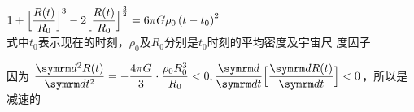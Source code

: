 \achapter

\answer $1+\Bigl[\dfrac{R(t)}{R_{0}}\Bigr]^{3}-2\Bigl[\dfrac{R(t)}{R_{0}}\Bigr]^{\frac{3}{2}}=6 \pi G \rho_{0}\left(t-t_{0}\right)^{2}$ \\
式中$  t _ { 0 }   $表示现在的时刻，$ \rho _ 0 $及$ R _ 0 $分别是$  t _ { 0 }   $时刻的平均密度及宇宙尺
度因子\vspace{-0.25em}

\answer 因为
$\dfrac{\dif^{2} R(t)}{\dif t^{2}}=-\dfrac{4 \pi G}{3}\cdot\dfrac{\rho_{0} R_{0}^{3}}{R_0}<0,\dfrac{\dif}{\dif t}\Bigl[\dfrac{\dif R(t)}{\dif t}\Bigr]<0$，所以是减速的
